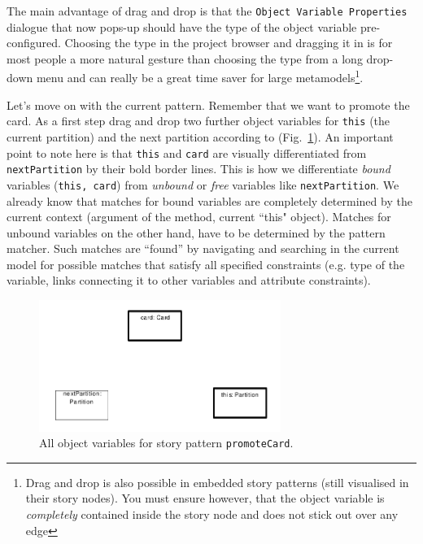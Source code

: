 The main advantage of drag and drop is that the \texttt{Object Variable
Pro\-per\-ties} dialogue that now pops-up should have the type of the object
variable pre-configured. Choosing the type in the project browser and dragging it in
is for most people a more natural gesture than choosing the type from a long
drop-down menu and can really be a great time saver for large
metamodels\footnote{Drag and drop is also possible in embedded story patterns
(still visualised in their story nodes).  You must ensure however, that the
object variable is \emph{completely} contained inside the story node and does
not stick out over any edge}.

Let's move on with the current pattern. Remember that we want to promote the
card.  As a first step drag and drop two further object variables for
\texttt{this} (the current partition) and the next partition according to
(Fig.~\ref{fig:sdm_check_complete_sp}).  An important point to note here is
that \texttt{this} and \texttt{card} are visually differentiated from
\texttt{nextPartition} by their bold border lines. This is how we differentiate
\emph{bound}  variables (\texttt{this, card}) from
\emph{unbound} or \emph{free} variables like \texttt{nextPartition}.  We already know that matches for bound variables are completely determined by the current
context (argument of the method, current ``this" object).  Matches for unbound
variables on the other hand, have to be determined by the pattern matcher.  Such
matches are ``found'' by navigating and searching in the current model for
possible matches that satisfy all specified constraints (e.g. type of the
variable, links connecting it to other variables and attribute constraints).

\begin{figure}[htbp]
\begin{center}
  \includegraphics[width=0.7\textwidth]{pics/sdmBilder/check/sdm25.pdf}
  \caption{All object variables for story pattern \texttt{promoteCard}.}
  \label{fig:sdm_check_complete_sp}
\end{center}
\end{figure}

